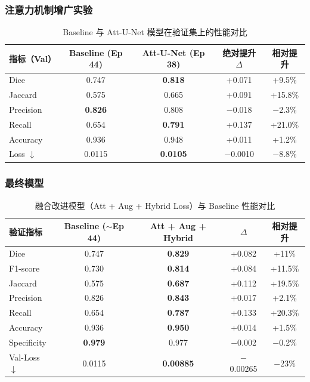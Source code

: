 \subsubsection{注意力机制增广实验}

\begin{table}[htbp]
    \centering
    \caption{Baseline 与 Att-U-Net 模型在验证集上的性能对比}
    \label{tab:att_unet}
    \begin{tabular}{lcccc}
        \toprule
        指标（Val） & Baseline (Ep 44) & Att-U-Net (Ep 38) & 绝对提升 $\Delta$ & 相对提升 \\
        \midrule
        Dice        & 0.747 & \textbf{0.818} & +0.071 & +9.5\% \\
        Jaccard     & 0.575 & 0.665 & +0.091 & +15.8\% \\
        Precision   & \textbf{0.826} & 0.808 & $-$0.018 & $-$2.3\% \\
        Recall      & 0.654 & \textbf{0.791} & +0.137 & +21.0\% \\
        Accuracy    & 0.936 & 0.948 & +0.011 & +1.2\% \\
        Loss $\downarrow$ & 0.0115 & \textbf{0.0105} & $-$0.0010 & $-$8.8\% \\
        \bottomrule
    \end{tabular}
\end{table}

\subsubsection{最终模型}

\begin{table}[htbp]
    \centering
    \caption{融合改进模型（Att + Aug + Hybrid Loss）与 Baseline 性能对比}
    \label{tab:final_model}
    \begin{tabular}{lcccc}
        \toprule
        验证指标 & Baseline ($\sim$Ep 44) & Att + Aug + Hybrid & $\Delta$ & 相对提升 \\
        \midrule
        Dice        & 0.747 & \textbf{0.829} & +0.082 & +11\% \\
        F1-score    & 0.730 & \textbf{0.814} & +0.084 & +11.5\% \\
        Jaccard     & 0.575 & \textbf{0.687} & +0.112 & +19.5\% \\
        Precision   & 0.826 & \textbf{0.843} & +0.017 & +2.1\% \\
        Recall      & 0.654 & \textbf{0.787} & +0.133 & +20.3\% \\
        Accuracy    & 0.936 & \textbf{0.950} & +0.014 & +1.5\% \\
        Specificity & \textbf{0.979} & 0.977 & $-$0.002 & $-$0.2\% \\
        Val-Loss $\downarrow$ & 0.0115 & \textbf{0.00885} & $-$0.00265 & $-$23\% \\
        \bottomrule
    \end{tabular}
\end{table}

